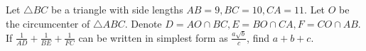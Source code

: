Let $\triangle BC$ be a triangle with side lengths $AB = 9, BC = 10, CA = 11$. Let $O$ be the circumcenter of $\triangle ABC$. Denote $D = AO \cap BC, E = BO \cap CA, F = CO \cap AB$. If $\frac{1}{AD} + \frac{1}{BE} + \frac{1}{FC}$ can be written in simplest form as $\frac{a \sqrt{b}}{c}$,  find $a + b + c$.